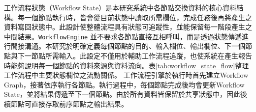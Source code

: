 \begin{ZhChapter}

\text 工作流程狀態（Workflow State）是本研究系統中各節點交換資料的核心資料結構。每一個節點執行時，皆會從目前狀態中讀取所需欄位，完成任務後再將產生之資料寫回狀態中。此設計使整體流程具有狀態可追蹤性，並能保留每一階段產生之中間結果。\texttt{WorkflowEngine} 並不要求各節點直接互相呼叫，而是透過狀態傳遞進行間接溝通。本研究於明確定義每個節點的目的、輸入欄位、輸出欄位、下一個節點與下一節點所需輸入。此設定不僅用於輔助工作流程追蹤，也使系統在產生報告時能夠說明每一個節點的資料來源與資料流向。表\ref{tab:workflow_state_flow}整理工作流程中主要狀態欄位之流動關係。
\text 工作流程引擎於執行時首先建立Workflow Graph，接著依序執行各節點。執行過程中，每個節點完成後均會更新Workflow State，並將結果傳遞至下一個節點。由於所有資料皆保留於共享狀態中，因此後續節點可直接存取前序節點之輸出結果。


\end{ZhChapter}
